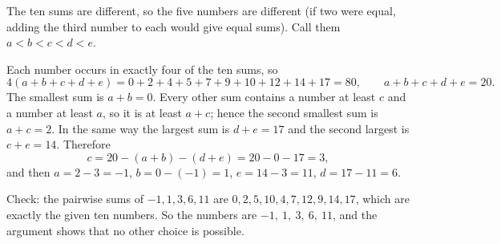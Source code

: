 The ten sums are different, so the five numbers are different (if two were equal, adding the third number to each would give equal sums). Call them $a<b<c<d<e$.

Each number occurs in exactly four of the ten sums, so
\[4(a+b+c+d+e)=0+2+4+5+7+9+10+12+14+17=80,\qquad a+b+c+d+e=20.\]
The smallest sum is $a+b=0$. Every other sum contains a number at least $c$ and a number at least $a$, so it is at least $a+c$; hence the second smallest sum is $a+c=2$. In the same way the largest sum is $d+e=17$ and the second largest is $c+e=14$. Therefore
\[c=20-(a+b)-(d+e)=20-0-17=3,\]
and then $a=2-3=-1$, $b=0-(-1)=1$, $e=14-3=11$, $d=17-11=6$.

Check: the pairwise sums of $-1,1,3,6,11$ are $0,2,5,10,4,7,12,9,14,17$, which are exactly the given ten numbers. So the numbers are $\boxed{-1,\ 1,\ 3,\ 6,\ 11}$, and the argument shows that no other choice is possible.

